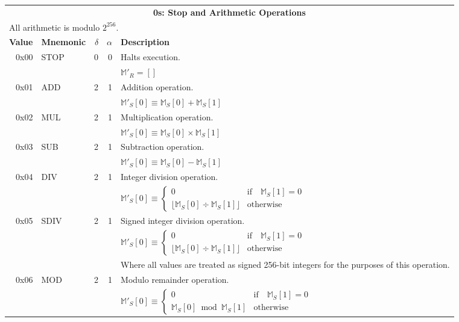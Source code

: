 \documentclass[9pt,oneside]{amsart}
\begin{document}
\begin{tabular*}{\columnwidth}[h]{rlrrl}
\toprule
\multicolumn{5}{c}{\textbf{0s: Stop and Arithmetic Operations}} \\
\multicolumn{5}{l}{All arithmetic is modulo $2^{256}$.} \vspace{5pt} \\
\textbf{Value} & \textbf{Mnemonic} & $\delta$ & $\alpha$ & \textbf{Description} \vspace{5pt} \\
0x00 & {\small STOP} & 0 & 0 & Halts execution. \\
&&&& $\mathbb{M}'_R = []$ \\
\midrule
0x01 & {\small ADD} & 2 & 1 & Addition operation. \\
&&&& $\mathbb{M}'_S[0] \equiv \mathbb{M}_S[0] + \mathbb{M}_S[1]$ \\
\midrule
0x02 & {\small MUL} & 2 & 1 & Multiplication operation. \\
&&&& $\mathbb{M}'_S[0] \equiv \mathbb{M}_S[0] \times \mathbb{M}_S[1]$ \\
\midrule
0x03 & {\small SUB} & 2 & 1 & Subtraction operation. \\
&&&& $\mathbb{M}'_S[0] \equiv \mathbb{M}_S[0] - \mathbb{M}_S[1]$ \\
\midrule
0x04 & {\small DIV} & 2 & 1 & Integer division operation. \\
&&&& $\mathbb{M}'_S[0] \equiv \begin{cases}0 & \text{if} \quad \mathbb{M}_S[1] = 0\\ \lfloor\mathbb{M}_S[0] \div \mathbb{M}_S[1]\rfloor & \text{otherwise}\end{cases}$  \\
\midrule
0x05 & {\small SDIV} & 2 & 1 & Signed integer division operation. \\
&&&& $\mathbb{M}'_S[0] \equiv \begin{cases}0 & \text{if} \quad \mathbb{M}_S[1] = 0\\ \lfloor\mathbb{M}_S[0] \div \mathbb{M}_S[1]\rfloor & \text{otherwise}\end{cases}$  \\
&&&& Where all values are treated as signed 256-bit integers for the purposes of this operation. \\
\midrule
0x06 & {\small MOD} & 2 & 1 & Modulo remainder operation. \\
&&&& $\mathbb{M}'_S[0] \equiv \begin{cases}0 & \text{if} \quad \mathbb{M}_S[1] = 0\\ \mathbb{M}_S[0] \bmod \mathbb{M}_S[1] & \text{otherwise}\end{cases}$  \\

\end{tabular*}
\end{document}
